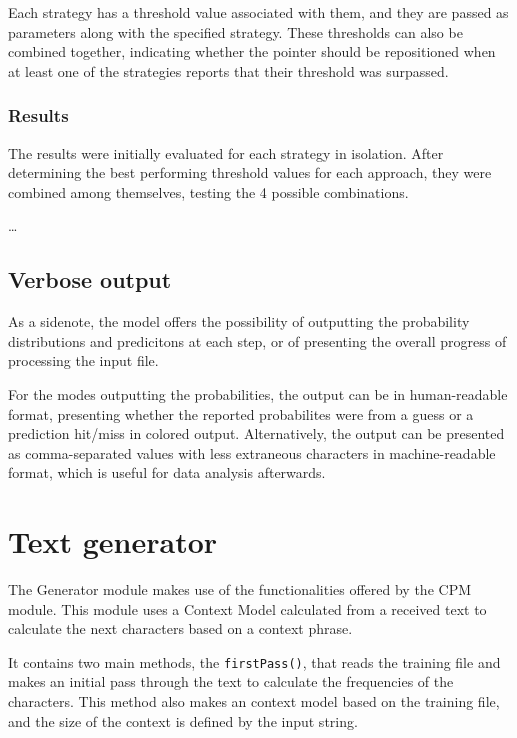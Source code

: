 \documentclass{article}
\begin{document}
Each strategy has a threshold value associated with them, and they are passed as parameters along with the specified strategy.
These thresholds can also be combined together, indicating whether the pointer should be repositioned when at least one of the strategies reports that their threshold was surpassed.

\subsubsection{Results}

The results were initially evaluated for each strategy in isolation.
After determining the best performing threshold values for each approach, they were combined among themselves, testing the 4 possible combinations.

\dots

\subsection{Verbose output}

As a sidenote, the model offers the possibility of outputting the probability distributions and predicitons at each step, or of presenting the overall progress of processing the input file.

For the modes outputting the probabilities, the output can be in human-readable format, presenting whether the reported probabilites were from a guess or a prediction hit/miss in colored output.
Alternatively, the output can be presented as comma-separated values with less extraneous characters in machine-readable format, which is useful for data analysis afterwards.


\section{Text generator}
\label{sec:text-generator}

The Generator module makes use of the functionalities offered by the CPM module.
This module uses a Context Model calculated from a received text to calculate the
next characters based on a context phrase. 

It contains two main methods, the \verb|firstPass()|, that reads the training file and makes an initial pass through the text to calculate the frequencies of the characters.
This method also makes an context model based on the training file, and the size of the context is defined by the input string. 
\end{document}
